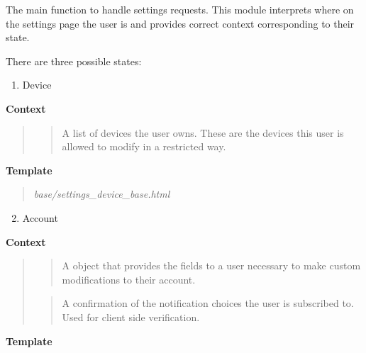\documentclass[letterpaper,10pt,english]{sphinxmanual}
\begin{document}
\begin{fulllineitems}
\label{modules/webapp:webapp.views.settings}
The main function to handle settings requests. This module interprets
where on the settings page the user is and provides correct context
corresponding to their state.

There are three possible states:
\begin{enumerate}
\item {} 
Device

\end{enumerate}

\textbf{Context}
\begin{quote}

\begin{quote}

A list of devices the user owns. These are the devices
this user is allowed to modify in a restricted way.
\end{quote}
\end{quote}

\textbf{Template}
\begin{quote}

\emph{base/settings\_device\_base.html}
\end{quote}
\begin{enumerate}
\setcounter{enumi}{1}
\item {} 
Account

\end{enumerate}

\textbf{Context}
\begin{quote}

\begin{quote}

A {\hyperref[modules/webapp:webapp.views.SettingsForm]{\emph{}}} object that provides the
fields to a user necessary to make custom modifications to their
account.
\end{quote}

\begin{quote}

A confirmation of the notification choices the user is
subscribed to. Used for client side verification.
\end{quote}
\end{quote}

\textbf{Template}
\begin{quote}


\end{quote}
\end{fulllineitems}
\end{document}
